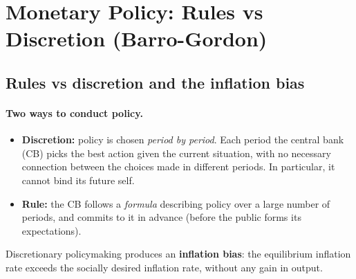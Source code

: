 \section{Monetary Policy: Rules vs Discretion (Barro-Gordon)}

\subsection{Rules vs discretion and the inflation bias }

\paragraph{Two ways to conduct policy.}
\begin{itemize}
  \item \textbf{Discretion:} policy is chosen \emph{period by period}. Each period the central bank (CB) picks the best action given the current situation, with no necessary connection between the choices made in different periods. In particular, it cannot bind its future self.
  \item \textbf{Rule:} the CB follows a \emph{formula} describing policy over a large number of periods, and commits to it in advance (before the public forms its expectations).
\end{itemize}

\begin{keybox}[title=Kydland--Prescott result]
Discretionary policymaking produces an \textbf{inflation bias}: the equilibrium inflation rate exceeds the socially desired inflation rate, without any gain in output.
\end{keybox}

